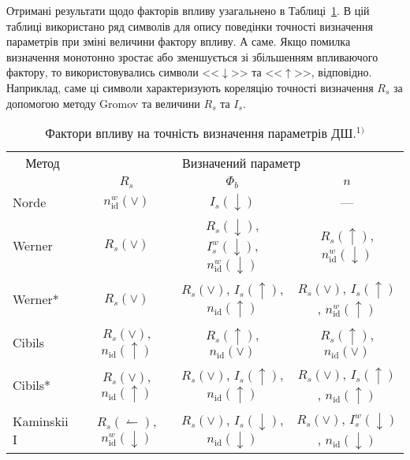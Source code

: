 Отримані результати щодо факторів впливу узагальнено в Таблиці~\ref{tabIF}.
В цій таблиці використано ряд символів для опису поведінки точності визначення параметрів при зміні величини фактору впливу.
А саме.
Якщо помилка визначення монотонно зростає або зменшується зі збільшенням впливаючого фактору, то використовувались символи <<$\downarrow$>> та <<$\uparrow$>>, відповідно.
Наприклад, саме ці символи характеризують кореляцію точності визначення $R_s$ за допомогою методу Gromov та величини $R_s$ та $I_s$.



\begin{table}
\caption{\label{tabIF}Фактори впливу на точність визначення параметрів ДШ.$^{1)}$
}
\begin{tabular}{|l|c|c|c|}
\hline
\multicolumn{1}{|c|}{Метод}&\multicolumn{3}{c|}{Визначений параметр}\\
\cline{2-4}
 &$R_s$&$\Phi_b$&$n$\\
\hhline{|====|}
Norde &$n_\mathrm{id}^w(\vee)$&$I_s(\downarrow)$&---\\
\hline
Werner &$R_s(\vee)$&$R_s(\downarrow)$, $I_s^w(\downarrow)$, $n_\mathrm{id}^w(\downarrow)$&$R_s(\uparrow)$, $n_\mathrm{id}^w(\downarrow)$\\
\hline
Werner* &$R_s(\vee)$&$R_s(\vee)$, $I_s(\uparrow)$, $n_\mathrm{id}(\uparrow)$&$R_s(\vee)$, $I_s(\uparrow)$, $n_\mathrm{id}^w(\uparrow)$\\
\hline
Cibils &$R_s(\vee)$, $n_\mathrm{id}(\uparrow)$&$R_s(\uparrow)$, $n_\mathrm{id}(\vee)$& $R_s(\uparrow)$, $n_\mathrm{id}(\vee)$\\
\hline
Cibils* &$R_s(\vee)$, $n_\mathrm{id}(\uparrow)$&$R_s(\vee)$, $I_s(\uparrow)$, $n_\mathrm{id}(\uparrow)$& $R_s(\vee)$, $I_s(\uparrow)$, $n_\mathrm{id}(\uparrow)$\\
\hline
Kaminskii I&$R_s(\leftharpoonup)$, $n_\mathrm{id}^w(\downarrow)$&$R_s(\vee)$, $I_s(\downarrow)$, $n_\mathrm{id}(\downarrow)$& $R_s(\vee)$, $I_s^w(\downarrow)$, $n_\mathrm{id}(\downarrow)$\\

\end{tabular}
\end{table}
